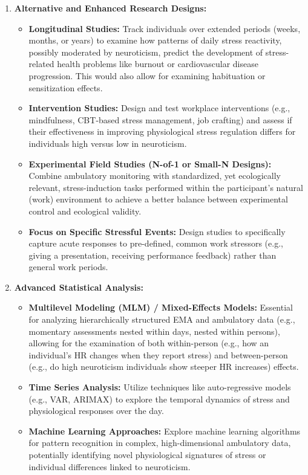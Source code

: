 \documentclass[11pt, a4paper]{report}
\begin{document}
\begin{enumerate}
\begin{itemize}
        \end{itemize}
    \item \textbf{Alternative and Enhanced Research Designs:}
        \begin{itemize}
            \item \textbf{Longitudinal Studies:} Track individuals over extended periods (weeks, months, or years) to examine how patterns of daily stress reactivity, possibly moderated by neuroticism, predict the development of stress-related health problems like burnout or cardiovascular disease progression. This would also allow for examining habituation or sensitization effects.
            \item \textbf{Intervention Studies:} Design and test workplace interventions (e.g., mindfulness, CBT-based stress management, job crafting) and assess if their effectiveness in improving physiological stress regulation differs for individuals high versus low in neuroticism.
            \item \textbf{Experimental Field Studies (N-of-1 or Small-N Designs):} Combine ambulatory monitoring with standardized, yet ecologically relevant, stress-induction tasks performed within the participant's natural (work) environment to achieve a better balance between experimental control and ecological validity.
            \item \textbf{Focus on Specific Stressful Events:} Design studies to specifically capture acute responses to pre-defined, common work stressors (e.g., giving a presentation, receiving performance feedback) rather than general work periods.
        \end{itemize}
    \item \textbf{Advanced Statistical Analysis:}
        \begin{itemize}
            \item \textbf{Multilevel Modeling (MLM) / Mixed-Effects Models:} Essential for analyzing hierarchically structured EMA and ambulatory data (e.g., momentary assessments nested within days, nested within persons), allowing for the examination of both within-person (e.g., how an individual's HR changes when they report stress) and between-person (e.g., do high neuroticism individuals show steeper HR increases) effects.
            \item \textbf{Time Series Analysis:} Utilize techniques like auto-regressive models (e.g., VAR, ARIMAX) to explore the temporal dynamics of stress and physiological responses over the day.
            \item \textbf{Machine Learning Approaches:} Explore machine learning algorithms for pattern recognition in complex, high-dimensional ambulatory data, potentially identifying novel physiological signatures of stress or individual differences linked to neuroticism.

\end{itemize}
\end{enumerate}
\end{document}
